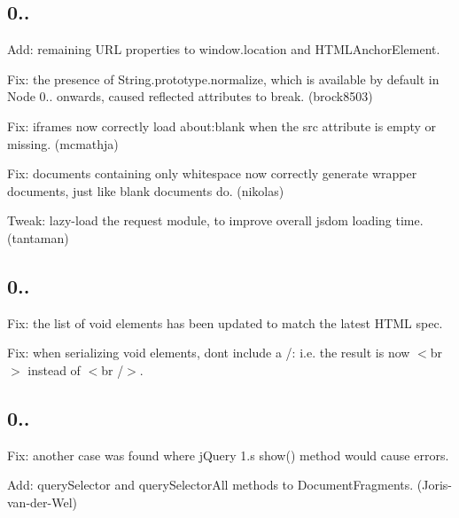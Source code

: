 \subsection*{0..}


\begin{DoxyItemize}
\item Add\+: remaining U\+RL properties to {\ttfamily window.\+location} and {\ttfamily H\+T\+M\+L\+Anchor\+Element}.
\item Fix\+: the presence of {\ttfamily String.\+prototype.\+normalize}, which is available by default in Node 0.. onwards, caused reflected attributes to break. (brock8503)
\item Fix\+: iframes now correctly load {\ttfamily about\+:blank} when the {\ttfamily src} attribute is empty or missing. (mcmathja)
\item Fix\+: documents containing only whitespace now correctly generate wrapper documents, just like blank documents do. (nikolas)
\item Tweak\+: lazy-\/load the request module, to improve overall jsdom loading time. (tantaman)
\end{DoxyItemize}

\subsection*{0..}


\begin{DoxyItemize}
\item Fix\+: the list of void elements has been updated to match the latest H\+T\+ML spec.
\item Fix\+: when serializing void elements, don\textquotesingle{}t include a {\ttfamily /}\+: i.\+e. the result is now {\ttfamily $<$br$>$} instead of {\ttfamily $<$br /$>$}.
\end{DoxyItemize}

\subsection*{0..}


\begin{DoxyItemize}
\item Fix\+: another case was found where j\+Query 1.\textquotesingle{}s {\ttfamily show()} method would cause errors.
\item Add\+: {\ttfamily query\+Selector} and {\ttfamily query\+Selector\+All} methods to {\ttfamily Document\+Fragment}s. (Joris-\/van-\/der-\/\+Wel)
\end{DoxyItemize}

